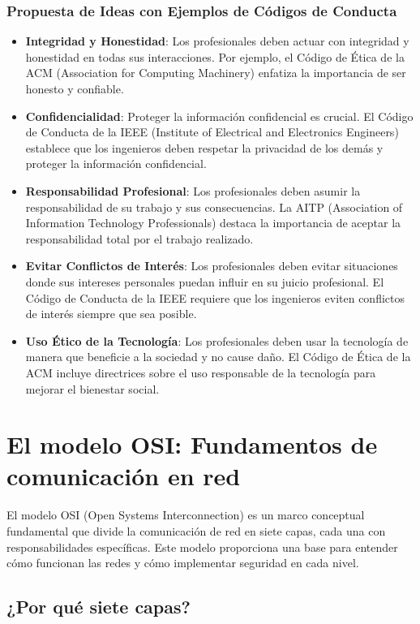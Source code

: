 \subsubsection{Propuesta de Ideas con Ejemplos de Códigos de Conducta}
\begin{itemize}
    \item \textbf{Integridad y Honestidad}: Los profesionales deben actuar con integridad y honestidad en todas sus interacciones. Por ejemplo, el Código de Ética de la ACM (Association for Computing Machinery) enfatiza la importancia de ser honesto y confiable.
    \item \textbf{Confidencialidad}: Proteger la información confidencial es crucial. El Código de Conducta de la IEEE (Institute of Electrical and Electronics Engineers) establece que los ingenieros deben respetar la privacidad de los demás y proteger la información confidencial.
    \item \textbf{Responsabilidad Profesional}: Los profesionales deben asumir la responsabilidad de su trabajo y sus consecuencias. La AITP (Association of Information Technology Professionals) destaca la importancia de aceptar la responsabilidad total por el trabajo realizado.
    \item \textbf{Evitar Conflictos de Interés}: Los profesionales deben evitar situaciones donde sus intereses personales puedan influir en su juicio profesional. El Código de Conducta de la IEEE requiere que los ingenieros eviten conflictos de interés siempre que sea posible.
    \item \textbf{Uso Ético de la Tecnología}: Los profesionales deben usar la tecnología de manera que beneficie a la sociedad y no cause daño. El Código de Ética de la ACM incluye directrices sobre el uso responsable de la tecnología para mejorar el bienestar social.
\end{itemize}


\section{El modelo OSI: Fundamentos de comunicación en red}

El modelo OSI (Open Systems Interconnection) es un marco conceptual fundamental que divide la comunicación de red en siete capas, cada una con responsabilidades específicas. Este modelo proporciona una base para entender cómo funcionan las redes y cómo implementar seguridad en cada nivel.

\subsection{¿Por qué siete capas?}

